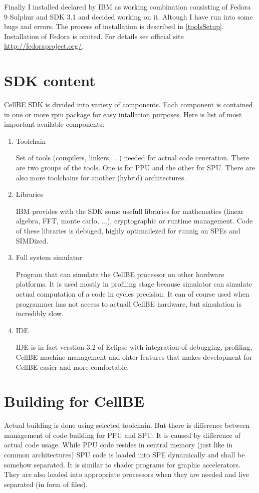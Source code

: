 \par
Finally I installed declared by IBM as working combination consisting of Fedora 9 Sulphur and SDK 3.1 and decided working on it. Altough I have run into some bugs and errors. The process of installation is described in \ref{toolsSetup}. Installation of Fedora is omited. For details see official site \url{http://fedoraproject.org/}.


\section {SDK content}

CellBE SDK is divided into variety of components. Each component is contained in one or more rpm package for easy intallation purposes. Here is list of most important available components:
\begin{enumerate}
  \item {Toolchain}
  \par
  Set of tools (compilers, linkers, ...) needed for actual code ceneration. There are two groups of the tools. One is for PPU and the other for SPU. There are also more toolchains for another (hybrid) architectures.

  \item {Libraries}
  \par
  IBM provides with the SDK some usefull libraries for mathematics (linear algebra, FFT, monte carlo, ...), cryptographic or runtime management. Code of these libraries is debuged, highly optimailezed for runnig on SPEs and SIMDized.

  \item {Full system simulator}
  \par
  Program that can simulate the CellBE processor on other hardware platforms. It is used mostly in profiling stage because simulator can simulate actual computation of a code in cycles precision. It can of course used when programmer has not access to actuall CellBE hardware, but simulation is incredibly slow.

  \item {IDE}
  \par
  IDE is in fact verstion 3.2 of Eclipse with integration of debugging, profiling, CellBE machine management and ohter features that makes development for CellBE easier and more comfortable.
\end{enumerate}

\section {Building for CellBE}
\par
Actual building is done using selected toolchain. But there is difference between management of code building for PPU and SPU. It is caused by difference of actual code usage. While PPU code resides in central memory (just like in common architectures) SPU code is loaded into SPE dynamically and shall be somehow separated. It is similar to shader programs for graphic accelerators. They are also loaded into appropriate processors when they are needed and live separated (in form of files).


